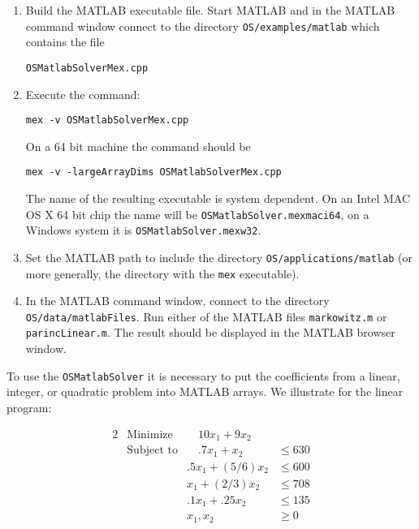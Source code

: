 \begin{enumerate}[{\bf Step 1:}]
\item{}  Build the MATLAB executable file. Start MATLAB and in the MATLAB command window connect to the directory {\tt OS/examples/matlab} which  contains the file 

\begin{verbatim}
OSMatlabSolverMex.cpp
\end{verbatim}

\item{} Execute the command:

\begin{verbatim}
mex -v OSMatlabSolverMex.cpp
\end{verbatim}

On a 64 bit machine the command should be

\begin{verbatim}
mex -v -largeArrayDims OSMatlabSolverMex.cpp
\end{verbatim}

The name of the resulting executable is system dependent. 
On an Intel MAC OS X 64 bit chip the name will be  {\tt OSMatlabSolver.mexmaci64}, 
on a Windows system it is {\tt OSMatlabSolver.mexw32}.  



\item{}  Set the MATLAB path to include the directory {\tt  OS/applications/matlab}  (or more generally, the directory with the {\tt mex} executable).


\item{}   In the MATLAB command window, connect to the directory {\tt OS/data/matlabFiles}. Run either of the MATLAB
files {\tt markowitz.m} or {\tt parincLinear.m}.  The result should be displayed in the MATLAB browser window.

\end{enumerate}


To use the {\tt OSMatlabSolver} it is necessary to put the coefficients  from a linear, integer, or quadratic problem into MATLAB arrays.   We illustrate for the linear program:

\begin{alignat}{2}
& \mbox{Minimize} & \quad
10 x_{1} + 9 x_{2}\label{eq:parinobj}\\
& \mbox{Subject to} & \quad .7x_{1} + x_{2}  &\le 630  \label{eq:parinccon1}\\
& & .5x_{1} + (5/6) x_{2} &\le 600 \label{eq:parinccon2}\\
& &  x_{1} + (2/3) x_{2} &\le 708 \label{eq:parinccon3}\\
& & .1x_{1} + .25 x_{2} &\le 135 \label{eq:parinccon4}\\
& & x_{1}, x_{2} &\ge 0 \label{eq:parincnonneg}
\end{alignat}

